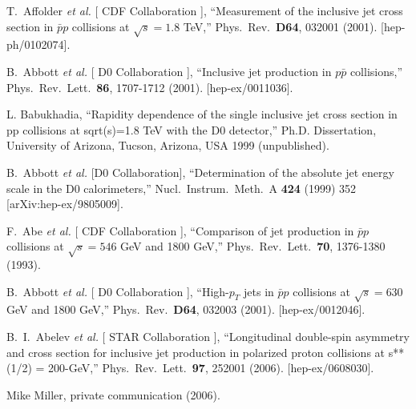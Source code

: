 \documentclass[11pt]{article}
\begin{document}
\begin{thebibliography}{99}
  T.~Affolder {\it et al.} [ CDF Collaboration ],
  ``Measurement of the inclusive jet cross section in $\bar{p}p$ collisions at $\sqrt{s} = 1.8$ TeV,''
  Phys.\ Rev.\  {\bf D64}, 032001 (2001).
  [hep-ph/0102074].

  B.~Abbott {\it et al.} [ D0 Collaboration ],
  ``Inclusive jet production in $p\bar{p}$ collisions,''
  Phys.\ Rev.\ Lett.\  {\bf 86}, 1707-1712 (2001).
  [hep-ex/0011036].

  L. Babukhadia, 
  ``Rapidity dependence of the single inclusive jet cross section
   in pp collisions at sqrt(s)=1.8 TeV with the D0 detector,''
    Ph.D. Dissertation, University of Arizona, Tucson, Arizona, USA 1999
   (unpublished).


  B.~Abbott {\it et al.}  [D0 Collaboration],
  ``Determination of the absolute jet energy scale in the D0 calorimeters,''
  Nucl.\ Instrum.\ Meth.\  A {\bf 424} (1999) 352
  [arXiv:hep-ex/9805009].




  F.~Abe {\it et al.} [ CDF Collaboration ],
  ``Comparison of jet production in $\bar{p}p$ collisions at $\sqrt{s} = 546$ GeV and 1800 GeV,''
  Phys.\ Rev.\ Lett.\  {\bf 70}, 1376-1380 (1993).

  B.~Abbott {\it et al.} [ D0 Collaboration ],
  ``High-$p_T$ jets in $\bar{p}p$ collisions at $\sqrt{s} = 630$ GeV and 1800 GeV,''
  Phys.\ Rev.\  {\bf D64}, 032003 (2001).
  [hep-ex/0012046].


  B.~I.~Abelev {\it et al.} [ STAR Collaboration ],
  ``Longitudinal double-spin asymmetry and cross section for inclusive jet production in polarized proton collisions at s**(1/2) = 200-GeV,''
  Phys.\ Rev.\ Lett.\  {\bf 97}, 252001 (2006).
  [hep-ex/0608030].


 Mike Miller, private communication (2006).  %



\end{thebibliography}
\end{document}
